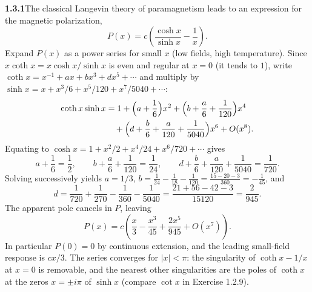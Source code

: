 \par\bigskip
\noindent\textbf{1.3.1}\quad The classical Langevin theory of paramagnetism
leads to an expression for the magnetic polarization,
\[
P(x)=c\left(\frac{\cosh x}{\sinh x}-\frac{1}{x}\right).
\]
Expand $P(x)$ as a power series for small $x$ (low fields, high temperature).
\solution
Since $x\coth x=x\cosh x/\sinh x$ is even and regular at $x=0$ (it tends
to $1$), write
$\coth x=x^{-1}+a x+b x^3+d x^5+\cdots$ and multiply by
$\sinh x=x+x^3/6+x^5/120+x^7/5040+\cdots$:
\[
 \begin{aligned}
 \coth x\sinh x
 &=1+\Bigl(a+\frac16\Bigr)x^2+\Bigl(b+\frac a6+\frac1{120}\Bigr)x^4\\
 &\quad+\Bigl(d+\frac b6+\frac a{120}+\frac1{5040}\Bigr)x^6+O(x^8).
 \end{aligned}
\]
Equating to $\cosh x=1+x^2/2+x^4/24+x^6/720+\cdots$ gives
\[
 a+\frac16=\frac12,\qquad
 b+\frac a6+\frac1{120}=\frac1{24},\qquad
 d+\frac b6+\frac a{120}+\frac1{5040}=\frac1{720}.
\]
Solving successively yields $a=1/3$,
$b=\frac1{24}-\frac1{18}-\frac1{120}=\frac{15-20-3}{360}=-\frac1{45}$, and
\[
 d=\frac1{720}+\frac1{270}-\frac1{360}-\frac1{5040}
  =\frac{21+56-42-3}{15120}=\frac2{945}.
\]
The apparent pole cancels in $P$, leaving
\[
 \boxed{P(x)=c\left(\frac x3-\frac{x^3}{45}
                          +\frac{2x^5}{945}+O(x^7)\right)}.
\]
In particular $P(0)=0$ by continuous extension, and the leading
small-field response is $cx/3$. The series converges for $|x|<\pi$:
the singularity of $\coth x-1/x$ at $x=0$ is removable, and the nearest
other singularities are the poles of $\coth x$ at the zeros $x=\pm i\pi$
of $\sinh x$ (compare $\cot x$ in Exercise 1.2.9).


